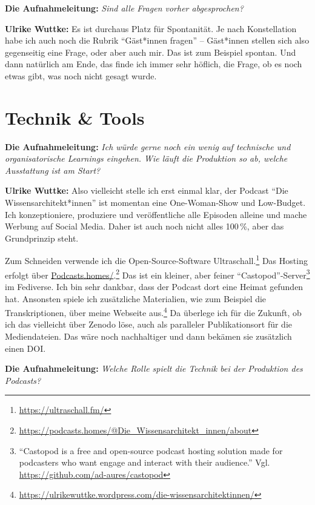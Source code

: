 \documentclass[a4paper,
fontsize=11pt,
oneside,
numbers=noperiodatend,
parskip=half-,
bibliography=totoc,
final
]{scrartcl}
\begin{document}
\textbf{Die Aufnahmeleitung:} \emph{Sind alle Fragen vorher
abgesprochen?}

\textbf{Ulrike Wuttke:} Es ist durchaus Platz für Spontanität. Je nach
Konstellation habe ich auch noch die Rubrik \enquote{Gäst*innen fragen}
-- Gäst*innen stellen sich also gegenseitig eine Frage, oder aber auch
mir. Das ist zum Beispiel spontan. Und dann natürlich am Ende, das finde
ich immer sehr höflich, die Frage, ob es noch etwas gibt, was noch nicht
gesagt wurde.

\section{Technik \& Tools}\label{technik-tools}

\textbf{Die Aufnahmeleitung:} \emph{Ich würde gerne noch ein wenig auf
technische und organisatorische Learnings eingehen. Wie läuft die
Produktion so ab, welche Ausstattung ist am Start?}

\textbf{Ulrike Wuttke:} Also vielleicht stelle ich erst einmal klar, der
Podcast \enquote{Die Wissensarchitekt*in\-nen} ist momentan eine
One-Woman-Show und Low-Budget. Ich konzeptioniere, produziere und
veröffentliche alle Episoden alleine und mache Werbung auf Social Media.
Daher ist auch noch nicht alles 100\,\%, aber das Grundprinzip steht.

Zum Schneiden verwende ich die Open-Source-Software
Ultraschall.\footnote{\url{https://ultraschall.fm/}} Das Hosting erfolgt
über \href{https://podcasts.homes}{Podcasts.homes/}.\footnote{\url{https://podcasts.homes/@Die_Wissensarchitekt_innen/about}}
Das ist ein kleiner, aber feiner \enquote{Castopod}-Server\footnote{\enquote{Castopod
  is a free and open-source podcast hosting solution made for podcasters
  who want engage and interact with their audience.} Vgl.
  \url{https://github.com/ad-aures/castopod}} im Fediverse. Ich bin sehr
dankbar, dass der Podcast dort eine Heimat gefunden hat. Ansonsten
spiele ich zusätzliche Materialien, wie zum Beispiel die
Transkriptionen, über meine Webseite aus.\footnote{\url{https://ulrikewuttke.wordpress.com/die-wissensarchitektinnen/}}
Da überlege ich für die Zukunft, ob ich das vielleicht über Zenodo löse,
auch als paralleler Publikationsort für die Mediendateien. Das wäre noch
nachhaltiger und dann bekämen sie zusätzlich einen DOI.

\textbf{Die Aufnahmeleitung:} \emph{Welche Rolle spielt die Technik bei
der Produktion des Podcasts?}
\end{document}
